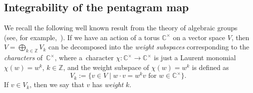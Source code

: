 \documentclass[pdftex]{sigma}
\numberwithin{equation}{section}
\newcommand{\Z}{{\mathbb Z}}
\newcommand{\C}{{\mathbb C}}
\newcommand{\ra}{\rightarrow}
\begin{document}
	
	\subsection{Integrability of the pentagram map}
	
	We recall the following well known result from the theory of algebraic groups (see, for example,~\mbox{\cite[Theorem 3.2.3]{Springer}}). If we have an action of a torus $\C^\times$ on a vector space $V$, then $V=\bigoplus_{k \in \Z} V_k$ can be decomposed into the \textit{weight subspaces} corresponding to the \textit{characters} of~$\C^\times$, where a~character $\chi\colon \C^\times \ra \C^\times$ is just a Laurent monomial $\chi(w)=w^{k}$, $k \in \Z$, and the weight subspace of $\chi(w)=w^k$ is defined as
	\[
	V_k:=\{v \in V \mid w \cdot v = w^k v \text{ for }w \in \C^\times\}.
	\]
	If $v \in V_k$, then we say that $v$ has \textit{weight} $k$.
	
\end{document}
